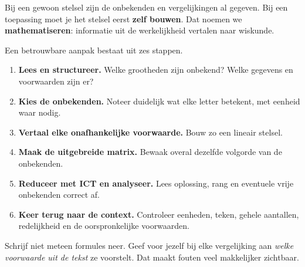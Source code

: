 \documentclass{ximera}
\begin{document}


Bij een gewoon stelsel zijn de onbekenden en vergelijkingen al gegeven.
Bij een toepassing moet je het stelsel eerst \textbf{zelf bouwen}.
Dat noemen we \textbf{mathematiseren}: informatie uit de werkelijkheid
vertalen naar wiskunde.


Een betrouwbare aanpak bestaat uit zes stappen.

\begin{enumerate}
  \item \textbf{Lees en structureer.}
        Welke grootheden zijn onbekend? Welke gegevens en voorwaarden zijn er?
  \item \textbf{Kies de onbekenden.}
        Noteer duidelijk wat elke letter betekent, met eenheid waar nodig.
  \item \textbf{Vertaal elke onafhankelijke voorwaarde.}
        Bouw zo een lineair stelsel.
  \item \textbf{Maak de uitgebreide matrix.}
        Bewaak overal dezelfde volgorde van de onbekenden.
  \item \textbf{Reduceer met ICT en analyseer.}
        Lees oplossing, rang en eventuele vrije onbekenden correct af.
  \item \textbf{Keer terug naar de context.}
        Controleer eenheden, teken, gehele aantallen, redelijkheid en de
        oorspronkelijke voorwaarden.
\end{enumerate}

\begin{opmerking}
Schrijf niet meteen formules neer. Geef voor jezelf bij elke vergelijking aan
\emph{welke voorwaarde uit de tekst} ze voorstelt. Dat maakt fouten veel
makkelijker zichtbaar.
\end{opmerking}



\end{document}
